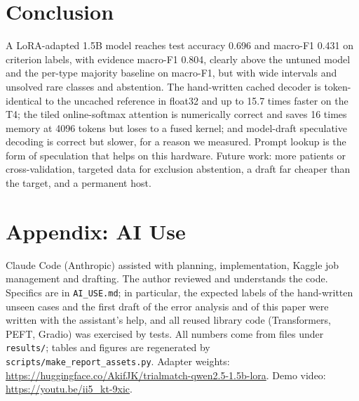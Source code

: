 \documentclass[conference]{IEEEtran}
\newcommand{\adapterurl}{\url{https://huggingface.co/AkifJK/trialmatch-qwen2.5-1.5b-lora}}
\newcommand{\videourl}{\url{https://youtu.be/ii5_kt-9xic}}
\begin{document}
\section{Conclusion}
A LoRA-adapted 1.5B model reaches test accuracy 0.696 and macro-F1 0.431 on criterion labels, with evidence macro-F1 0.804, clearly above the untuned model and the per-type majority baseline on macro-F1, but with wide intervals and unsolved rare classes and abstention. The hand-written cached decoder is token-identical to the uncached reference in float32 and up to 15.7 times faster on the T4; the tiled online-softmax attention is numerically correct and saves 16 times memory at 4096 tokens but loses to a fused kernel; and model-draft speculative decoding is correct but slower, for a reason we measured. Prompt lookup is the form of speculation that helps on this hardware. Future work: more patients or cross-validation, targeted data for exclusion abstention, a draft far cheaper than the target, and a permanent host.

\section*{Appendix: AI Use}
Claude Code (Anthropic) assisted with planning, implementation, Kaggle job management and drafting. The author reviewed and understands the code. Specifics are in \texttt{AI\_USE.md}; in particular, the expected labels of the hand-written unseen cases and the first draft of the error analysis and of this paper were written with the assistant's help, and all reused library code (Transformers, PEFT, Gradio) was exercised by tests. All numbers come from files under \texttt{results/}; tables and figures are regenerated by \texttt{scripts/make\_report\_assets.py}. Adapter weights: \adapterurl. Demo video: \videourl.
\end{document}
